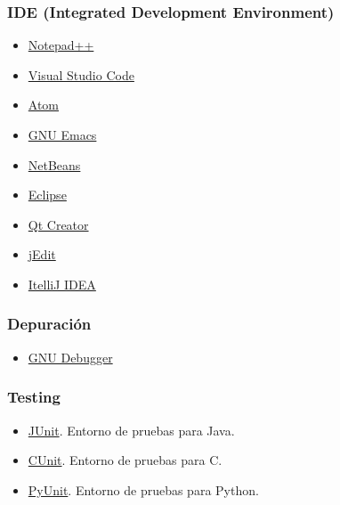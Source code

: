 \subsubsection{IDE (Integrated Development Environment)}
\begin{multicols}{2}
\begin{itemize}[nosep]
\item \href{https://notepad-plus-plus.org/}{Notepad++}
\item \href{https://code.visualstudio.com/}{Visual Studio Code}
\item \href{https://atom.io/}{Atom}
\item \href{https://www.gnu.org/s/emacs/}{GNU Emacs}
\item \href{https://netbeans.org/}{NetBeans}
\item \href{https://eclipse.org/}{Eclipse}
\item \href{https://www.qt.io/ide/}{Qt Creator}
\item \href{http://www.jedit.org/}{jEdit}
\item \href{https://www.jetbrains.com/idea/}{ItelliJ IDEA}
\end{itemize}
\end{multicols}



\subsubsection{Depuración}
\begin{itemize}[nosep]
\item \href{https://www.gnu.org/s/gdb/}{GNU Debugger}
\end{itemize}


\subsubsection{Testing}
\begin{multicols}{2}
\begin{itemize}[nosep]
\item \href{http://junit.org}{JUnit}. Entorno de pruebas para Java.
\item \href{http://cunit.sourceforge.net/}{CUnit}. Entorno de pruebas para C.
\item \href{https://wiki.python.org/moin/PyUnit}{PyUnit}. Entorno de pruebas para Python.
\end{itemize}
\end{multicols}

